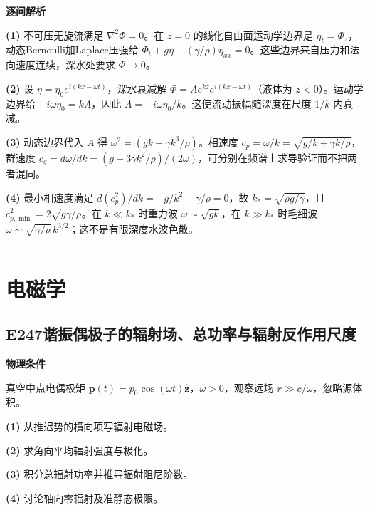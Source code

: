 \documentclass[UTF8,a4paper,11pt,oneside,openany]{ctexbook}
\begin{document}
\par\medskip\noindent\textbf{逐问解析}
\par\noindent\textbf{(1)} 不可压无旋流满足 \(\nabla^2\Phi=0\)。在 \(z=0\) 的线化自由面运动学边界是 \(\eta_t=\Phi_z\)，动态Bernoulli加Laplace压强给 \(\Phi_t+g\eta-(\gamma/\rho)\eta_{xx}=0\)。这些边界来自压力和法向速度连续，深水处要求 \(\Phi\to0\)。
\par\noindent\textbf{(2)} 设 \(\eta=\eta_0e^{i(kx-\omega t)}\)，深水衰减解 \(\Phi=Ae^{kz}e^{i(kx-\omega t)}\)（液体为 \(z<0\)）。运动学边界给 \(-i\omega\eta_0=kA\)，因此 \(A=-i\omega\eta_0/k\)。这使流动振幅随深度在尺度 \(1/k\) 内衰减。
\par\noindent\textbf{(3)} 动态边界代入 \(A\) 得 \(\omega^2=(gk+\gamma k^3/\rho)\)。相速度 \(c_p=\omega/k=\sqrt{g/k+\gamma k/\rho}\)，群速度 \(c_g=d\omega/dk=(g+3\gamma k^2/\rho)/(2\omega)\)，可分别在频谱上求导验证而不把两者混同。
\par\noindent\textbf{(4)} 最小相速度满足 \(d(c_p^2)/dk=-g/k^2+\gamma/\rho=0\)，故 \(k_*=\sqrt{\rho g/\gamma}\)，且 \(c_{p,\min}^2=2\sqrt{g\gamma/\rho}\)。在 \(k\ll k_*\) 时重力波 \(\omega\sim\sqrt{gk}\)，在 \(k\gg k_*\) 时毛细波 \(\omega\sim\sqrt{\gamma/\rho}\,k^{3/2}\)；这不是有限深度水波色散。

\par\bigskip\hrule\bigskip
\chapter{电磁学}
\section*{E247\quad 谐振偶极子的辐射场、总功率与辐射反作用尺度}
\textbf{物理条件}\par 真空中点电偶极矩 \(\boldsymbol p(t)=p_0\cos(\omega t)\hat{\boldsymbol z}\)，\(\omega>0\)，观察远场 \(r\gg c/\omega\)，忽略源体积。
\par\noindent\textbf{(1)} 从推迟势的横向项写辐射电磁场。
\par\noindent\textbf{(2)} 求角向平均辐射强度与极化。
\par\noindent\textbf{(3)} 积分总辐射功率并推导辐射阻尼阶数。
\par\noindent\textbf{(4)} 讨论轴向零辐射及准静态极限。
\end{document}
